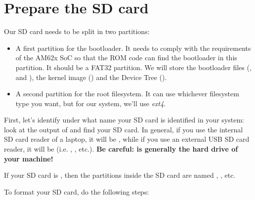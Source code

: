\section{Prepare the SD card}

Our SD card needs to be split in two partitions:

\begin{itemize}

\item A first partition for the bootloader. It needs to comply with
  the requirements of the AM62x SoC so that the ROM code can find
  the bootloader in this partition. It should be a FAT32 partition.
  We will store the bootloader files (,
   and ), the kernel image
  () and the Device Tree
  ().

\item A second partition for the root filesystem. It can use
  whichever filesystem type you want, but for our system, we'll use
  {\em ext4}.

\end{itemize}

First, let's identify under what name your SD card is identified in
your system: look at the output of  and
find your SD card. In general, if you use the internal SD card reader
of a laptop, it will be , while if you use an external
USB SD card reader, it will be  (i.e. , ,
etc.). {\bf Be careful:  is generally the hard drive of
  your machine!}

If your SD card is , then the partitions inside the
SD card are named , , etc.

To format your SD card, do the following steps:

